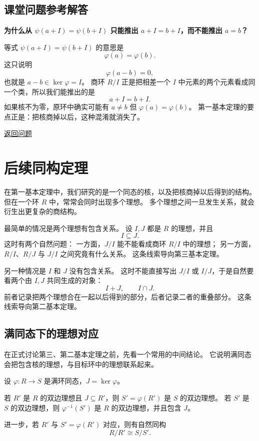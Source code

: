 \subsection*{课堂问题参考解答}

\begin{exercise}\label{ex:ans-first-isomorphism-not-a-equals-b}
\hypertarget{ans:first-isomorphism-not-a-equals-b}{}
\textbf{为什么从 $\psi(a+I)=\psi(b+I)$ 只能推出 $a+I=b+I$，而不能推出 $a=b$？}

等式 $\psi(a+I)=\psi(b+I)$ 的意思是
\[
\varphi(a)=\varphi(b).
\]
这只说明
\[
\varphi(a-b)=0,
\]
也就是 $a-b\in\ker\varphi=I$。
商环 $R/I$ 正是把相差一个 $I$ 中元素的两个元素看成同一个类，所以我们能推出的是
\[
a+I=b+I.
\]
如果核不为零，原环中确实可能有 $a\neq b$ 但 $\varphi(a)=\varphi(b)$。
第一基本定理的要点正是：把核商掉以后，这种混淆就消失了。

\hyperlink{q:first-isomorphism-not-a-equals-b}{返回问题}
\end{exercise}

\section{后续同构定理}\label{sec:further-isomorphism-theorems-rings}

在第一基本定理中，我们研究的是一个同态的核，以及把核商掉以后得到的结构。
但在一个环 $R$ 中，常常会同时出现多个理想。
多个理想之间一旦发生关系，就会衍生出更复杂的商结构。

最简单的情况是两个理想有包含关系。
设 $I,J$ 都是 $R$ 的理想，并且
\[
I\subseteq J.
\]
这时有两个自然问题：
一方面，$J/I$ 能不能看成商环 $R/I$ 中的理想；
另一方面，$R/I$、$R/J$ 与 $J/I$ 之间究竟有什么关系。
这条线索导向第三基本定理。

另一种情况是 $I$ 和 $J$ 没有包含关系。
这时不能直接写出 $J/I$ 或 $I/J$，于是自然要看两个由 $I,J$ 共同生成的对象：
\[
I+J,\qquad I\cap J.
\]
前者记录把两个理想合在一起以后得到的部分，后者记录二者的重叠部分。
这条线索导向第二基本定理。

\subsection{满同态下的理想对应}\label{sec:ideal-correspondence-quotient}

在正式讨论第三、第二基本定理之前，先看一个常用的中间结论。
它说明满同态会把包含核的理想，与目标环中的理想联系起来。

\begin{theorem}[满同态下的理想对应]\label{thm:ideal-correspondence-quotient}
设 $\varphi:R\to S$ 是满环同态，$J=\ker\varphi$。

若 $R'$ 是 $R$ 的双边理想且 $J\subseteq R'$，则 $S'=\varphi(R')$ 是 $S$ 的双边理想。
若 $S'$ 是 $S$ 的双边理想，则 $\varphi^{-1}(S')$ 是 $R$ 的双边理想，并且包含 $J$。

进一步，若 $R'$ 与 $S'=\varphi(R')$ 对应，则有自然同构
\[
R/R'\cong S/S'.
\]
\end{theorem}

